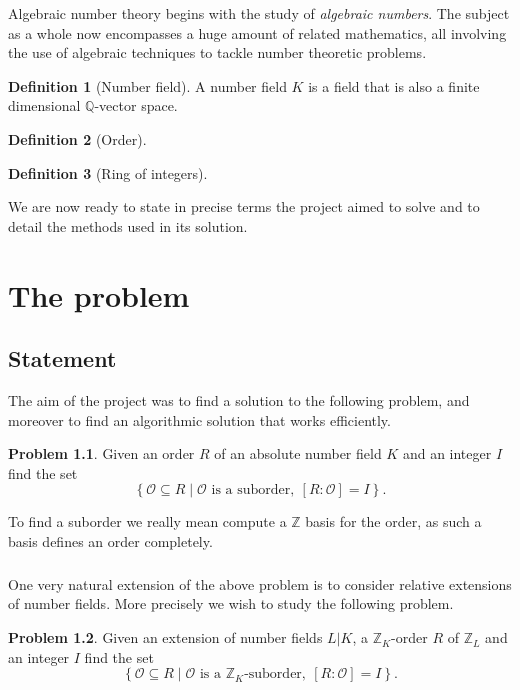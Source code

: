 \documentclass[a4paper,abstracton]{scrreprt}
\theoremstyle{definition}
\newtheorem{defn}{Definition}
\newtheorem{prob}{Problem}
\newcommand{\QQ}{\mathbb{Q}}
\newcommand{\ZZ}{\mathbb{Z}}
\renewcommand{\O}{\mathcal{O}}
\begin{document}
Algebraic number theory begins with the study of \emph{algebraic numbers}.
The subject as a whole now encompasses a huge amount of related mathematics, all involving the use of algebraic techniques to tackle number theoretic problems. %

\begin{defn}[Number field]
A number field $K$ is a field that is also a finite dimensional $\QQ$-vector space.
\end{defn}

\begin{defn}[Order]
\end{defn}

\begin{defn}[Ring of integers]
\end{defn}


We are now ready to state in precise terms the project aimed to solve and to detail the methods used in its solution.

\chapter{The problem}
\section{Statement}

The aim of the project was to find a solution to the following problem, and moreover to find an algorithmic solution that works efficiently.

\begin{prob}
Given an order $R$ of an absolute number field $K$ and an integer $I$ find the set
\[\left\{ \O\subseteq R \mid \O\text{ is a suborder},\ [R\colon\O] = I\right\}.\]
\end{prob}

To find a suborder we really mean compute a $\ZZ$ basis for the order, as such a basis defines an order completely.

\paragraph{}
One very natural extension of the above problem is to consider relative extensions of number fields.
More precisely we wish to study the following problem.

\begin{prob} %
Given an extension of number fields $L|K$, a $\ZZ_K$-order $R$ of $\ZZ_L$ and an integer $I$ find the set
\[\left\{ \O\subseteq R \mid \O\text{ is a $\ZZ_K$-suborder},\ [R\colon\O] = I\right\}.\]
\end{prob}
\end{document}
